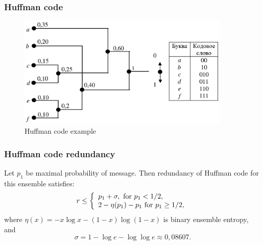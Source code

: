 \documentclass[14pt]{beamer}
\begin{document}
\begin{frame}
\frametitle{Huffman code}
\begin{itemize}    

\begin{figure}[ht]
\begin{minipage}{1.0\linewidth}
\includegraphics[width=0.9\textwidth]{fig2_4.eps}
\caption{Huffman code example} \label{Huf_ex}
\end{minipage}
\end{figure}

\end{itemize}
\end{frame}


\begin{frame}
\frametitle{Huffman code redundancy}  

\begin{theorem} \label{th_huf_red}
Let $p_1 $ be maximal probability of message. Then redundancy of Huffman code for this ensemble satisfies:
    \begin{equation}
    \label{part2eq6} r \le \left\{ {{\begin{array}{*{20}c}
     {p_1 + \sigma ,\mbox{ for }p_1 < 1 / 2,} \hfill \\
     {2 - \eta(p_1 ) - p_1 \mbox{ for }p_1 \ge 1 / 2,} \hfill \\
    \end{array} }} \right.
    \end{equation}
    where $\eta(x) = - x\log x - (1 - x)\log (1 - x)$ is binary ensemble entropy, and
    \begin{equation}
    \label{part2eq7} \sigma = 1 - \log e - \log \log e \approx 0,08607.
    \end{equation}
    \end{theorem}
\end{frame}
\end{document}
